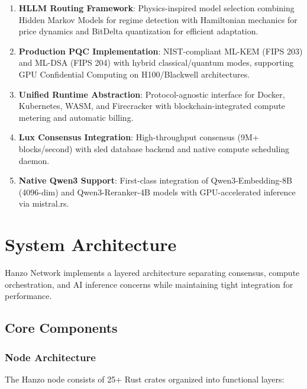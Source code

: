 \documentclass[11pt,twocolumn]{article}
\begin{document}
\begin{enumerate}
\item \textbf{HLLM Routing Framework}: Physics-inspired model selection combining Hidden Markov Models for regime detection with Hamiltonian mechanics for price dynamics and BitDelta quantization for efficient adaptation.

\item \textbf{Production PQC Implementation}: NIST-compliant ML-KEM (FIPS 203) and ML-DSA (FIPS 204) with hybrid classical/quantum modes, supporting GPU Confidential Computing on H100/Blackwell architectures.

\item \textbf{Unified Runtime Abstraction}: Protocol-agnostic interface for Docker, Kubernetes, WASM, and Firecracker with blockchain-integrated compute metering and automatic billing.

\item \textbf{Lux Consensus Integration}: High-throughput consensus (9M+ blocks/second) with sled database backend and native compute scheduling daemon.

\item \textbf{Native Qwen3 Support}: First-class integration of Qwen3-Embedding-8B (4096-dim) and Qwen3-Reranker-4B models with GPU-accelerated inference via mistral.rs.
\end{enumerate}

\section{System Architecture}

Hanzo Network implements a layered architecture separating consensus, compute orchestration, and AI inference concerns while maintaining tight integration for performance.

\subsection{Core Components}

\subsubsection{Node Architecture}

The Hanzo node consists of 25+ Rust crates organized into functional layers:
\end{document}
